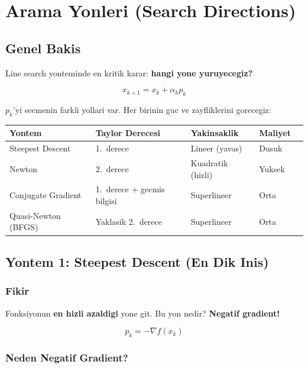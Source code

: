 \documentclass[12pt,a4paper]{article}
\theoremstyle{definition}
\theoremstyle{remark}
\begin{document}
\newpage
\section{Arama Yonleri (Search Directions)}

\subsection{Genel Bakis}

Line search yonteminde en kritik karar: \textbf{hangi yone yuruyecegiz?}

\[
x_{k+1} = x_k + \alpha_k p_k
\]

$p_k$'yi secmenin farkli yollari var. Her birinin guc ve zayfliklerini gorecegiz:

\begin{center}
\begin{tabular}{@{}lllll@{}}
\toprule
\textbf{Yontem} & \textbf{Taylor Derecesi} & \textbf{Yakinsaklik} & \textbf{Maliyet} \\
\midrule
Steepest Descent & 1.\ derece & Lineer (yavas) & Dusuk \\
Newton & 2.\ derece & Kuadratik (hizli) & Yuksek \\
Conjugate Gradient & 1.\ derece + gecmis bilgisi & Superlineer & Orta \\
Quasi-Newton (BFGS) & Yaklasik 2.\ derece & Superlineer & Orta \\
\bottomrule
\end{tabular}
\end{center}

\subsection{Yontem 1: Steepest Descent (En Dik Inis)}

\subsubsection{Fikir}

Fonksiyonun \textbf{en hizli azaldigi} yone git. Bu yon nedir? \textbf{Negatif gradient!}

\[
\boxed{p_k = -\nabla f(x_k)}
\]

\subsubsection{Neden Negatif Gradient?}
\end{document}

